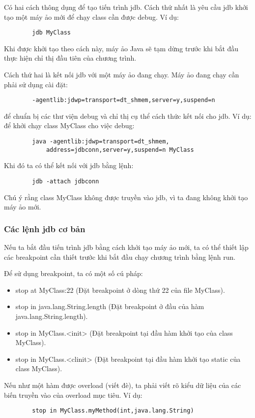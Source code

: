 \documentclass{article}
\begin{document}
    Có hai cách thông dụng để tạo tiến trình jdb. Cách thứ nhất là yêu cầu jdb
    khởi tạo một máy ảo mới để chạy class cần được debug. Ví dụ:
    \begin{verbatim}
        jdb MyClass
    \end{verbatim}
    Khi được khởi tạo theo cách này, máy ảo Java sẽ tạm dừng trước khi bắt đầu
    thực hiện chỉ thị đầu tiên của chương trình.

    Cách thứ hai là kết nối jdb với một máy ảo đang chạy. Máy ảo đang chạy cần 
    phải sử dụng cài đặt:
    \begin{verbatim}
        -agentlib:jdwp=transport=dt_shmem,server=y,suspend=n
    \end{verbatim}
    để chuẩn bị các thư viện debug và chỉ thị cụ thể cách thức kết nối cho jdb. 
    Ví dụ: để khởi chạy class MyClass cho việc debug:
    \begin{verbatim}
        java -agentlib:jdwp=transport=dt_shmem,
            address=jdbconn,server=y,suspend=n MyClass
    \end{verbatim}
    Khi đó ta có thể kết nối với jdb bằng lệnh:
    \begin{verbatim}
        jdb -attach jdbconn 
    \end{verbatim}
    Chú ý rằng class MyClass không được truyền vào jdb, vì ta đang không khởi tạo máy
    ảo mới.

    \subsubsection{Các lệnh jdb cơ bản}
    Nếu ta bắt đầu tiến trình jdb bằng cách khởi tạo máy ảo mới, ta có thể thiết lập
    các breakpoint cần thiết trước khi bắt đầu chạy chương trình bằng lệnh run.

    Để sử dụng breakpoint, ta có một số cú pháp:
    \begin{itemize}
        \item {stop at MyClass:22 (Đặt breakpoint ở dòng thứ 22 của 
        file MyClass).}
        \item {stop in java.lang.String.length (Đặt breakpoint ở đầu của hàm\\
        java.lang.String.length).}
        \item {stop in MyClass.<init> (Đặt breakpoint tại đầu hàm khởi tạo của class MyClass).}
        \item {stop in MyClass.<clinit> (Đặt breakpoint tại đầu hàm khởi tạo static của class MyClass).}
    \end{itemize}
    Nếu như một hàm được overload (viết đè), ta phải viết rõ kiểu dữ liệu của các biến truyền vào
    của overload mục tiêu. Ví dụ: 
    \begin{verbatim}
        stop in MyClass.myMethod(int,java.lang.String)
    \end{verbatim}
\end{document}

